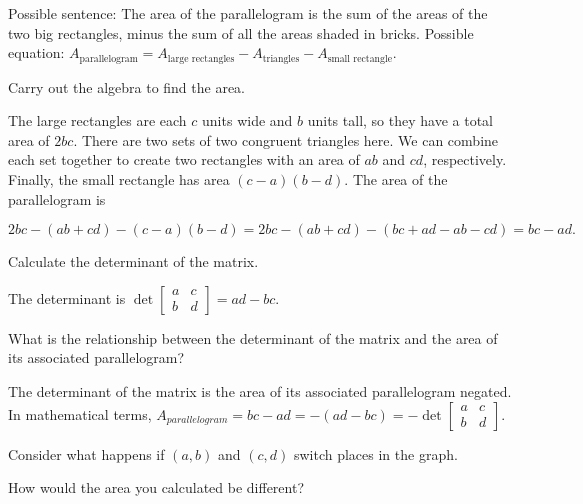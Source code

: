 \documentclass[../key.tex]{subfiles}
\begin{document}
Possible sentence: The area of the parallelogram is the sum of the areas of the two big rectangles, minus the sum of all the areas shaded in bricks.
Possible equation: $A_{\text{parallelogram}}=A_{\text{large rectangles}}-A_{\text{triangles}}-A_{\text{small rectangle}}.$

\begin{inner_problem}
\item Carry out the algebra to find the area.
\end{inner_problem}

The large rectangles are each $c$ units wide and $b$ units tall, so they have a total area of $2bc$. There are two sets of two congruent triangles here. We can combine each set together to create two rectangles with an area of $ab$ and $cd$, respectively. Finally, the small rectangle has area $(c-a)(b-d)$. The area of the parallelogram is

$$2bc-(ab+cd)-(c-a)(b-d) = 2bc-(ab+cd) - (bc+ad-ab-cd) = bc-ad.$$

\begin{inner_problem}
\item Calculate the determinant of the matrix.
\end{inner_problem}

The determinant is $\det \begin{bmatrix} a & c \\ b & d \end{bmatrix} =ad-bc$.

\begin{inner_problem}
\item What is the relationship between the determinant of the matrix and the area of its associated parallelogram?
\end{inner_problem}

The determinant of the matrix is the area of its associated parallelogram negated. In mathematical terms, $A_{parallelogram}=bc-ad = -(ad-bc) = -\det \begin{bmatrix} a & c \\ b & d \end{bmatrix}$.

\begin{inner_problem}
\item Consider what happens if $(a,b)$ and $(c,d)$ switch places in the graph.
\end{inner_problem}

\begin{iinner_problem}[start=1]
\item How would the area you calculated be different?
\end{iinner_problem}
\end{document}
